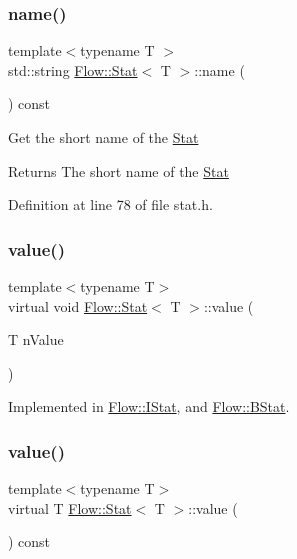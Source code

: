 \subsubsection{\texorpdfstring{name()}{name()}\hspace{0.1cm}{\footnotesize\ttfamily [2/2]}}
{\footnotesize\ttfamily template$<$typename T $>$ \\
std\+::string \hyperlink{class_flow_1_1_stat}{Flow\+::\+Stat}$<$ T $>$\+::name (\begin{DoxyParamCaption}{ }\end{DoxyParamCaption}) const}

Get the short name of the \hyperlink{class_flow_1_1_stat}{Stat} \begin{DoxyReturn}{Returns}
The short name of the \hyperlink{class_flow_1_1_stat}{Stat} 
\end{DoxyReturn}


Definition at line 78 of file stat.\+h.

\hypertarget{class_flow_1_1_stat_ab28bdb79f7d6444f1e341a62ef039b96}{}\label{class_flow_1_1_stat_ab28bdb79f7d6444f1e341a62ef039b96} 
\subsubsection{\texorpdfstring{value()}{value()}\hspace{0.1cm}{\footnotesize\ttfamily [1/2]}}
{\footnotesize\ttfamily template$<$typename T$>$ \\
virtual void \hyperlink{class_flow_1_1_stat}{Flow\+::\+Stat}$<$ T $>$\+::value (\begin{DoxyParamCaption}\item[{T}]{n\+Value }\end{DoxyParamCaption})\hspace{0.3cm}{\ttfamily [pure virtual]}}



Implemented in \hyperlink{class_flow_1_1_i_stat_aff7abbcc9c44f1f07ed956f9d571c674}{Flow\+::\+I\+Stat}, and \hyperlink{class_flow_1_1_b_stat_a65299c411a0e8767b6715557de1cbf23}{Flow\+::\+B\+Stat}.

\hypertarget{class_flow_1_1_stat_a8861df6366e182078ea6c9bac2b718e2}{}\label{class_flow_1_1_stat_a8861df6366e182078ea6c9bac2b718e2} 
\subsubsection{\texorpdfstring{value()}{value()}\hspace{0.1cm}{\footnotesize\ttfamily [2/2]}}
{\footnotesize\ttfamily template$<$typename T$>$ \\
virtual T \hyperlink{class_flow_1_1_stat}{Flow\+::\+Stat}$<$ T $>$\+::value (\begin{DoxyParamCaption}{ }\end{DoxyParamCaption}) const\hspace{0.3cm}{\ttfamily [pure virtual]}}



